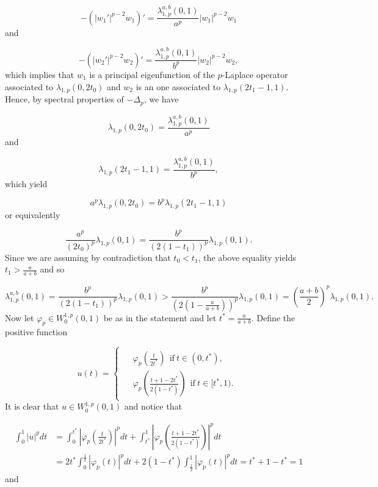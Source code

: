 \documentclass[a4paper,11pt]{article}
\begin{document}
{\[
-(|w_1'|^{p-2}w_1)' = \frac{\lambda_{1,p}^{a,b}(0,1)}{a^{p}}|w_1|^{p-2}w_1
\]
and

\[
-(|w_2'|^{p-2}w_2)' = \frac{\lambda_{1,p}^{a,b}(0,1)}{b^{p}}|w_2|^{p-2}w_2,
\]
which implies that $w_1$ is a principal eigenfunction of the $p$-Laplace operator associated to $\lambda_{1,p}(0,2t_{0})$ and $w_2$ is an one associated to $\lambda_{1,p}(2t_{1}-1, 1)$. Hence, by spectral properties of $- \Delta_p$, we have

\[
\lambda_{1,p}(0,2t_{0}) = \frac{\lambda_{1,p}^{a,b}(0,1)}{a^{p}}
\]
and

\[
\lambda_{1,p}(2t_{1}-1, 1) = \frac{\lambda_{1,p}^{a,b}(0,1)}{b^{p}},
\]
which yield

\[
a^{p}\lambda_{1,p}(0,2t_{0}) = b^{p}\lambda_{1,p}(2t_{1}-1, 1)
\]
or equivalently

\begin{equation}\label{lambdaab1}
 \frac{a^{p}}{(2t_{0})^{p}} \lambda_{1,p}(0,1) = \frac{b^{p}}{(2(1-t_{1}))^{p}} \lambda_{1,p}(0,1).
\end{equation}
Since we are assuming by contradiction that $t_0 < t_1$, the above equality yields $t_{1} > \frac{a}{a+b}$ and so

\begin{equation} \label{lambdaab2}
\lambda_{1,p}^{a,b}(0,1) =  \frac{b^{p}}{(2(1 - t_{1}))^{p}}\lambda_{1,p}(0,1) > \frac{b^{p}}{\left(2\left(1 - \frac{a}{a+b}\right)\right)^{p}}\lambda_{1,p}(0,1)  = \left(\frac{a+b}{2}\right)^{p}\lambda_{1,p}(0,1).
\end{equation}
Now let $\varphi_{p} \in W_0^{1,p}(0,1)$ be as in the statement and let $t^{*} =\frac{a}{a+b}$. Define the positive function

\begin{equation}\label{lambdaab3}
u(t) =
\begin{cases}
\begin{aligned}
     & \varphi_{p}\left(\frac{t}{2t^{*}}\right)\ \ \text{if} \ t \in (0,t^{*}), \\
     & \varphi_{p}\left(\frac{t + 1 - 2t^{*}}{2(1 - t^{*})}\right)\ \ \text{if} \ t \in [t^{*},1).
\end{aligned}
\end{cases}
\end{equation}
It is clear that $u \in W^{1,p}_{0}(0,1)$ and notice that

\begin{align*}
\int_{0}^{1} |u|^{p} dt &= \int_{0}^{t^{*}} \left|\varphi_{p}\left(\frac{t}{2t^{*}}\right)\right|^{p} dt + \int_{t^{*}}^{1} \left|\varphi_{p}\left(\frac{t+1-2t^{*}}{2(1-t^{*})}\right)\right|^{p} dt \\
&= 2t^{*} \int_{0}^{\frac{1}{2}}|\varphi_{p}(t)|^{p} dt + 2(1-t^{*}) \int_{\frac{1}{2}}^{1}|\varphi_{p}(t)|^{p} dt = t^{*} + 1 - t^{*} = 1
\end{align*}
and

}
\end{document}
